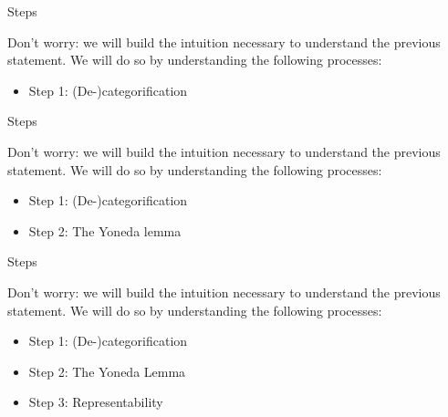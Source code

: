 \documentclass[tikz]{beamer}
\theoremstyle{definition}
\begin{document}
\begin{frame}{Steps}
    
    Don't worry: we will build the intuition necessary to understand the 
    previous statement. We will do so by understanding the following processes:
    
\begin{itemize}
    \item Step 1: (De-)categorification
\end{itemize}
    
\end{frame}

\begin{frame}{Steps}
    
    Don't worry: we will build the intuition necessary to understand the 
    previous statement. We will do so by understanding the following processes:
    
\begin{itemize}
    \item Step 1: (De-)categorification
    \item Step 2: The Yoneda lemma
\end{itemize}
\end{frame}

\begin{frame}{Steps}
    
    Don't worry: we will build the intuition necessary to understand the 
    previous statement. We will do so by understanding the following processes:
    
\begin{itemize}
    \item Step 1: (De-)categorification
    \item Step 2: The Yoneda Lemma
    \item Step 3: Representability
\end{itemize}
\end{frame}
\end{document}
